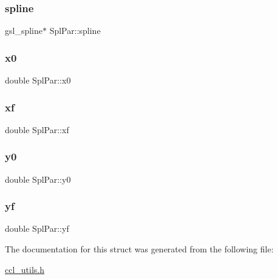 \mbox{\label{struct_spl_par_ae8f88172b1b5531e97049f3996734d61}} 
\subsubsection{\texorpdfstring{spline}{spline}}
{\footnotesize\ttfamily gsl\+\_\+spline$\ast$ Spl\+Par\+::spline}

\mbox{\label{struct_spl_par_a13c74ee83d8d7f138bac671adaa7cf74}} 
\subsubsection{\texorpdfstring{x0}{x0}}
{\footnotesize\ttfamily double Spl\+Par\+::x0}

\mbox{\label{struct_spl_par_a81d8596b683922ed144fd8766e01f3f3}} 
\subsubsection{\texorpdfstring{xf}{xf}}
{\footnotesize\ttfamily double Spl\+Par\+::xf}

\mbox{\label{struct_spl_par_a49d3136602dec3eff0bfd5c631615cb0}} 
\subsubsection{\texorpdfstring{y0}{y0}}
{\footnotesize\ttfamily double Spl\+Par\+::y0}

\mbox{\label{struct_spl_par_a3e483146b3649beeaa42e854f7b7a386}} 
\subsubsection{\texorpdfstring{yf}{yf}}
{\footnotesize\ttfamily double Spl\+Par\+::yf}



The documentation for this struct was generated from the following file\+:\begin{DoxyCompactItemize}
\item 
\mbox{\hyperlink{ccl__utils_8h}{ccl\+\_\+utils.\+h}}\end{DoxyCompactItemize}
